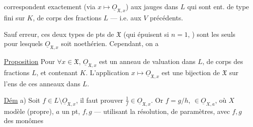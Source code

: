 correspondent exactement (via $x\longmapsto\underline{O}_{\mathfrak X,x}$) aux jauges dans $L$ qui sont ent. de type fini sur $K$, de corps des fractions $L$ --- i.e. aux $V$ précédents.

Sauf erreur, ces deux types de pts de $\mathfrak X$ (qui épuisent  si $n=1$,\unsure{)} ) sont les seuls pour lesquels $\underline{O}_{\mathfrak X,x}$ soit noethérien. Cependant, on a

\uline{Proposition} Pour $\forall x\in\mathfrak X$, $\underline{O}_{\mathfrak X,x}$ est un anneau de valuation dans $L$, de corps des fractions $L$, et contenant $K$. L'application $x\longmapsto\underline{O}_{\mathfrak X,x}$ est une bijection de $\mathfrak X$ sur l'ens de ces anneaux dans $L$.

\uline{Dém} a) Soit $f\in L\setminus\underline{O}_{\mathfrak X,x}$, il faut prouver $\frac1f\in\underline{O}_{\mathfrak X,x}$. Or $f=g/h$, $\in\underline{O}_{X,a}$, où $X$ modèle  (propre), $a$ un pt, $f,g$  --- utilisant la résolution,   de paramètres, avec $f,g$ des monômes
